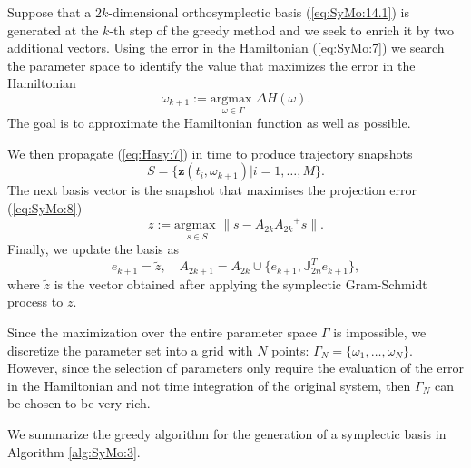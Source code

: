 \documentclass[final]{siamart}
\begin{document}
Suppose that a $2k$-dimensional {{\color{black}} orthosymplectic basis (\ref{eq:SyMo:14.1})} is generated at the $k$-th step of the greedy method and we seek to enrich it by two additional vectors. Using the error in the Hamiltonian (\ref{eq:SyMo:7}) we search the parameter space to identify the value that maximizes the error in the Hamiltonian
\begin{equation} \label{eq:SyMo:14.5}
	\omega_{k+1} := \underset{\omega\in \Gamma}{\text{argmax }}\Delta H(\omega).
\end{equation}
The goal is to approximate the Hamiltonian function as well as possible. 

We then propagate (\ref{eq:Hasy:7}) in time to produce trajectory snapshots 
\begin{equation}
	S=\{ \mathbf z(t_i,\omega_{k+1}) | i = 1,\dots,M \}.
\end{equation} 
The next basis vector is the snapshot that maximises the projection error (\ref{eq:SyMo:8})
{{\color{black}} 
\begin{equation} \label{eq:SyMo:14.6}
	z := \underset{s\in S}{\text{argmax }} \| s - A_{2k}{A_{2k}}^+s \|.
\end{equation}
}
Finally, we update the basis as
{{\color{black}}
\begin{equation} \label{eq:SyMo:14.7}
	e_{k+1} = \tilde z, \quad A_{2k+1} = A_{2k}\cup \{ e_{k+1} , \mathbb J_{2n}^Te_{k+1} \},
\end{equation}
}
where $\tilde z$ is the vector obtained {{\color{black}} after} applying the symplectic Gram-Schmidt process to $z$. 

Since the maximization over the entire parameter space $\Gamma$ is impossible, we discretize the parameter set into a grid with $N$ points: $\Gamma_N = \{ \omega_1,\dots,\omega_N\}$. However, since the selection of parameters only require the evaluation of the error in the Hamiltonian and not time integration of the original system, then $\Gamma_N$ can be chosen {{\color{black}} to be} very rich.

We summarize the greedy algorithm for the generation of a symplectic basis in Algorithm \ref{alg:SyMo:3}.
\end{document}
